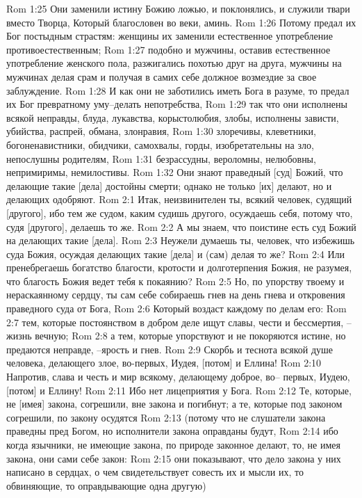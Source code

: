 Rom 1:25  Они заменили истину Божию ложью, и поклонялись, и служили твари вместо Творца, Который благословен во веки, аминь.
Rom 1:26  Потому предал их Бог постыдным страстям: женщины их заменили естественное употребление противоестественным;
Rom 1:27  подобно и мужчины, оставив естественное употребление женского пола, разжигались похотью друг на друга, мужчины на мужчинах делая срам и получая в самих себе должное возмездие за свое заблуждение.
Rom 1:28  И как они не заботились иметь Бога в разуме, то предал их Бог превратному уму--делать непотребства,
Rom 1:29  так что они исполнены всякой неправды, блуда, лукавства, корыстолюбия, злобы, исполнены зависти, убийства, распрей, обмана, злонравия,
Rom 1:30  злоречивы, клеветники, богоненавистники, обидчики, самохвалы, горды, изобретательны на зло, непослушны родителям,
Rom 1:31  безрассудны, вероломны, нелюбовны, непримиримы, немилостивы.
Rom 1:32  Они знают праведный [суд] Божий, что делающие такие [дела] достойны смерти; однако не только [их] делают, но и делающих одобряют.
Rom 2:1  Итак, неизвинителен ты, всякий человек, судящий [другого], ибо тем же судом, каким судишь другого, осуждаешь себя, потому что, судя [другого], делаешь то же.
Rom 2:2  А мы знаем, что поистине есть суд Божий на делающих такие [дела].
Rom 2:3  Неужели думаешь ты, человек, что избежишь суда Божия, осуждая делающих такие [дела] и (сам) делая то же?
Rom 2:4  Или пренебрегаешь богатство благости, кротости и долготерпения Божия, не разумея, что благость Божия ведет тебя к покаянию?
Rom 2:5  Но, по упорству твоему и нераскаянному сердцу, ты сам себе собираешь гнев на день гнева и откровения праведного суда от Бога,
Rom 2:6  Который воздаст каждому по делам его:
Rom 2:7  тем, которые постоянством в добром деле ищут славы, чести и бессмертия, --жизнь вечную;
Rom 2:8  а тем, которые упорствуют и не покоряются истине, но предаются неправде, --ярость и гнев.
Rom 2:9  Скорбь и теснота всякой душе человека, делающего злое, во-первых, Иудея, [потом] и Еллина!
Rom 2:10  Напротив, слава и честь и мир всякому, делающему доброе, во-- первых, Иудею, [потом] и Еллину!
Rom 2:11  Ибо нет лицеприятия у Бога.
Rom 2:12  Те, которые, не [имея] закона, согрешили, вне закона и погибнут; а те, которые под законом согрешили, по закону осудятся
Rom 2:13  (потому что не слушатели закона праведны пред Богом, но исполнители закона оправданы будут,
Rom 2:14  ибо когда язычники, не имеющие закона, по природе законное делают, то, не имея закона, они сами себе закон:
Rom 2:15  они показывают, что дело закона у них написано в сердцах, о чем свидетельствует совесть их и мысли их, то обвиняющие, то оправдывающие одна другую)
